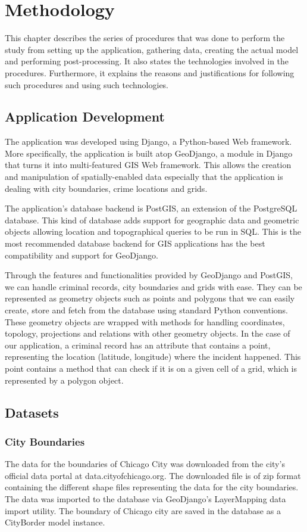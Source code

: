 \chapter{Methodology}
    This chapter describes the series of procedures that was done to perform the study \textemdash from setting up the application, gathering data, creating the actual model and performing post-processing. It also states the technologies involved in the procedures. Furthermore, it explains the reasons and justifications for following such procedures and using such technologies.
\section{Application Development}
    The application was developed using Django, a Python-based Web framework. More specifically, the application is built atop GeoDjango, a module in Django that turns it into multi-featured GIS Web framework. This allows the creation and manipulation of spatially-enabled data especially that the application is dealing with city boundaries, crime locations and grids.

    The application's database backend is PostGIS, an extension of the PostgreSQL database. This kind of database adds support for geographic data and geometric objects allowing location and topographical queries to be run in SQL. This is the most recommended database backend for GIS applications has the best compatibility and support for GeoDjango.

    Through the features and functionalities provided by GeoDjango and PostGIS, we can handle criminal records, city boundaries and grids with ease. They can be represented as geometry objects such as points and polygons that we can easily create, store and fetch from the database using standard Python conventions. These geometry objects are wrapped with methods for handling coordinates, topology, projections and relations with other geometry objects. In the case of our application, a criminal record has an attribute that contains a point, representing the location (latitude, longitude) where the incident happened. This point contains a method that can check if it is on a given cell of a grid, which is represented by a polygon object.

\section{Datasets}
    \subsection{City Boundaries}
        The data for the boundaries of Chicago City was downloaded from the city's official data portal at data.cityofchicago.org. The downloaded file is of zip format containing the different shape files representing the data for the city boundaries. The data was imported to the database via GeoDjango's LayerMapping data import utility. The boundary of Chicago city are saved in the database as a CityBorder model instance.
